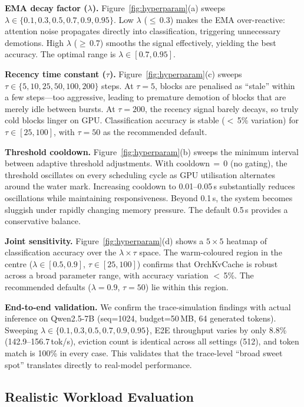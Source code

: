 \documentclass[conference]{IEEEtran}
\begin{document}
\textbf{EMA decay factor ($\lambda$).} Figure~\ref{fig:hyperparam}(a) sweeps $\lambda \in \{0.1, 0.3, 0.5, 0.7, 0.9, 0.95\}$.  Low $\lambda$ ($\leq$\,0.3) makes the EMA over-reactive: attention noise propagates directly into classification, triggering unnecessary demotions.  High $\lambda$ ($\geq$\,0.7) smooths the signal effectively, yielding the best accuracy.  The optimal range is $\lambda \in [0.7, 0.95]$.

\textbf{Recency time constant ($\tau$).} Figure~\ref{fig:hyperparam}(c) sweeps $\tau \in \{5, 10, 25, 50, 100, 200\}$ steps.  At $\tau{=}5$, blocks are penalised as ``stale'' within a few steps---too aggressive, leading to premature demotion of blocks that are merely idle between bursts.  At $\tau{=}200$, the recency signal barely decays, so truly cold blocks linger on GPU.  Classification accuracy is stable ($<$\,5\% variation) for $\tau \in [25, 100]$, with $\tau{=}50$ as the recommended default.

\textbf{Threshold cooldown.} Figure~\ref{fig:hyperparam}(b) sweeps the minimum interval between adaptive threshold adjustments.  With cooldown$\,{=}\,$0 (no gating), the threshold oscillates on every scheduling cycle as GPU utilisation alternates around the water mark.  Increasing cooldown to 0.01--0.05\,s substantially reduces oscillations while maintaining responsiveness.  Beyond 0.1\,s, the system becomes sluggish under rapidly changing memory pressure.  The default 0.5\,s provides a conservative balance.

\textbf{Joint sensitivity.} Figure~\ref{fig:hyperparam}(d) shows a $5{\times}5$ heatmap of classification accuracy over the $\lambda{\times}\tau$ space.  The warm-coloured region in the centre ($\lambda \in [0.5, 0.9]$, $\tau \in [25, 100]$) confirms that OrchKvCache is robust across a broad parameter range, with accuracy variation $<$\,5\%.  The recommended defaults ($\lambda{=}0.9$, $\tau{=}50$) lie within this region.

\textbf{End-to-end validation.} We confirm the trace-simulation findings with actual inference on Qwen2.5-7B (seq=1024, budget=50\,MB, 64 generated tokens).  Sweeping $\lambda \in \{0.1, 0.3, 0.5, 0.7, 0.9, 0.95\}$, E2E throughput varies by only 8.8\% (142.9--156.7\,tok/s), eviction count is identical across all settings (512), and token match is 100\% in every case.  This validates that the trace-level ``broad sweet spot'' translates directly to real-model performance.

\subsection{Realistic Workload Evaluation}
\label{sec:realistic}
\end{document}
